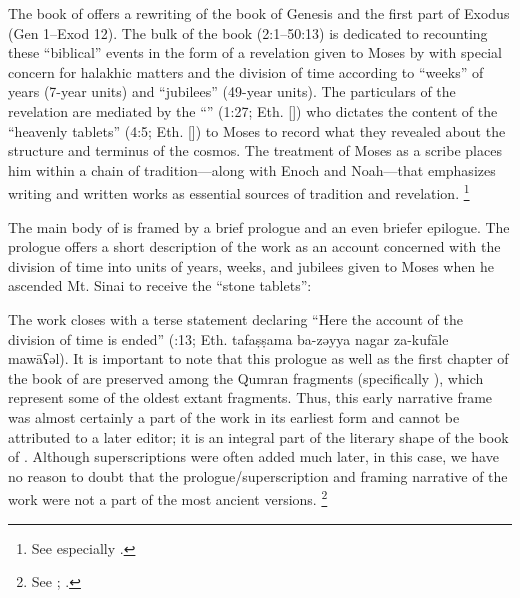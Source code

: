 The book of \jub offers a rewriting of the book of Genesis and the first part of Exodus (Gen 1--Exod 12).\autocite[1:17]{vanderkam2018} The bulk of the book (2:1--50:13) is dedicated to recounting these ``biblical'' events in the form of a revelation given to Moses by \yahweh with special concern for halakhic matters and the division of time according to ``weeks'' of years (7-year units) and ``jubilees'' (49-year units). The particulars of the revelation are mediated by the ``\ap'' (1:27; Eth.  []) who dictates the content of the ``heavenly tablets'' (4:5; Eth.  []) to Moses to record what they revealed about the structure and terminus of the cosmos.\autocite{martinez_najman-tigchelaar2012} The treatment of Moses as a scribe places him within a chain of tradition---along with Enoch and Noah---that emphasizes writing and written works as essential sources of tradition and revelation.%
        \footnote{See especially
                \cite[381--388]{najman_jsj1999}.} 

The main body of \jub is framed by a brief prologue and an even briefer epilogue. The prologue offers a short description of the work as an account concerned with the division of time into units of years, weeks, and jubilees given to Moses when he ascended Mt. Sinai to receive the ``stone tablets'':

%
\noindent
The work closes with a terse statement declaring ``Here the account of the division of time is ended'' (:13; Eth. 
        {tafaṣṣama ba-zəyya nagar za-kufāle mawāʕəl}).
\noindent
It is important to note that this prologue as well as the first chapter of the book of \jub are preserved among the Qumran fragments (specifically ), which represent some of the oldest extant \jub fragments. Thus, this early narrative frame was almost certainly a part of the work in its earliest form and cannot be attributed to a later editor; it is an integral part of the literary shape of the book of \jub. Although superscriptions were often added much later, in this case, we have no reason to doubt that the prologue/superscription and framing narrative of the work were not a part of the most ancient versions.%
        \footnote{See 
                \cite[1:125]{vanderkam2018};
                \cite[25]{vanderkam_metso-etal2010}.}

